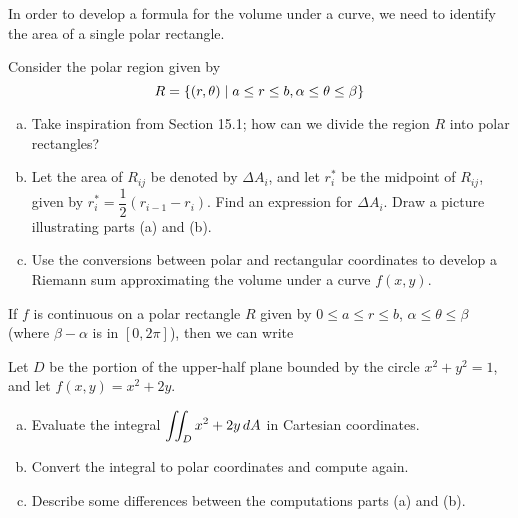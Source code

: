 \documentclass[notes]{subfiles}
\begin{document}
		In order to develop a formula for the volume under a curve, we need to identify the area of a single polar rectangle.
		\begin{ex}
		Consider the polar region given by
		\[R = \left\lbrace (r,\theta)\mid a\leq r\leq b, \alpha\leq\theta\leq \beta \right\rbrace\]
			\begin{enumerate}[(a)]
				\item Take inspiration from Section 15.1; how can we divide the region $R$ into polar rectangles?
					
				\item Let the area of $R_{ij}$ be denoted by $\Delta A_i$, and let $r_i^*$ be the midpoint of $R_{ij}$, given by $r_i^* = \dfrac{1}{2}(r_{i-1}-r_i)$. Find an expression for $\Delta A_i$. Draw a picture illustrating parts (a) and (b).
					
				\item Use the conversions between polar and rectangular coordinates to develop a Riemann sum approximating the volume under a curve $f(x,y)$.
				
			\end{enumerate}

		\end{ex}
		
		\begin{rmk}
			If $f$ is continuous on a polar rectangle $R$ given by $0\leq a\leq r\leq b$, $\alpha\leq\theta\leq\beta$ (where $\beta - \alpha$ is in $[0,2\pi]$), then we can write\\[30pt]
		\end{rmk}

		\begin{ex}
			Let $D$ be the portion of the upper-half plane bounded by the circle $x^2 + y^2 = 1$, and let $f(x,y) = x^2+2y$.
			\begin{enumerate}[(a)]
				\item Evaluate the integral $\displaystyle \iint_D x^2 + 2y\, dA$ in Cartesian coordinates.
				\item Convert the integral to polar coordinates and compute again.
				\item Describe some differences between the computations parts (a) and (b).
			\end{enumerate}
		\end{ex}
			
\end{document}
